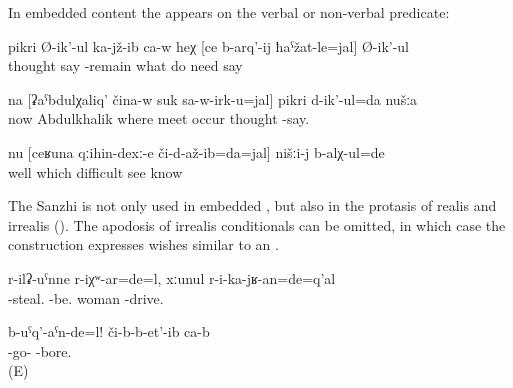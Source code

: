 In embedded content  the  appears on the verbal or non-verbal predicate:
%
\begin{exe}
	\ex	\label{ex:He is thinking, sitting, about what must be done}
	\gll	pikri	Ø-ik'-ul	ka-jž-ib	ca-w	heχ	[ce		b-arq'-ij	ħaˁžat-le=jal]	Ø-ik'-ul\\
		thought	say	-remain			what	do	need	say\\
	\glt	{}

	\ex	\label{ex:‎‎‎We are thinking where to meet Abdulkhalik}
	\gll	na	[ʡaˁbdulχaliq'	čina-w	suk	sa-w-irk-u=jal]	pikri	d-ik'-ul=da	nušːa	\\
		now	Abdulkhalik	where	meet	occur	thought	-say.	\\
	\glt	{}

	\ex	\label{ex:‎Well we knew which difficulties we had seen}
	\gll	nu	[ceʁuna	qːihin-dexː-e	či-d-až-ib=da=jal]	nišːi-j	b-alχ-ul=de\\
		well	which	difficult	see		know\\
	\glt	{}
\end{exe}

The Sanzhi  is not only used in embedded , but also in the protasis of realis and irrealis   (). The apodosis of irrealis conditionals can be omitted, in which case the construction expresses wishes similar to an  .

\begin{exe}
	\ex	\label{ex:If the woman would have stolen, they would/should have imprisoned her}
	\gll	r-ilʡ-uˁnne	r-iχʷ-ar=de=l,	xːunul r-i-ka-jʁ-an=de=q'al\\
		-steal.	-be.	woman -drive. \\
	\glt	{}
		
	\ex	\label{ex:If they would go! They bore (me).}
	\gll	b-uˁq'-aˁn-de=l!	či-b-b-et'-ib	ca-b\\
		-go-	-bore.	 \\
	\glt	{} (E)
\end{exe}


